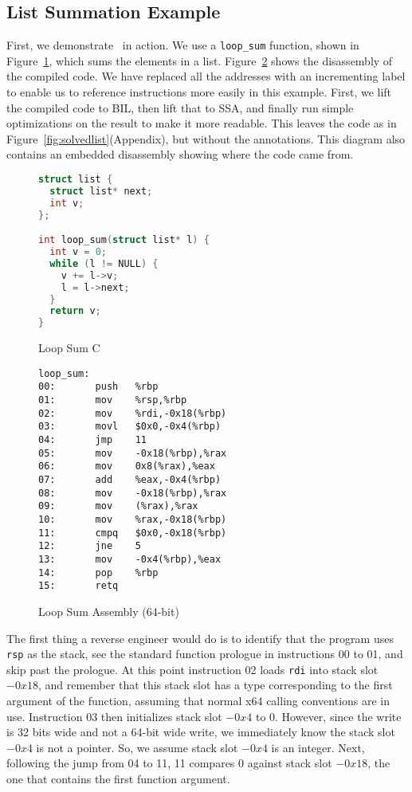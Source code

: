\subsection{List Summation Example}
\label{subsec:workedexample}
First, we demonstrate \bitr\ in action. We use a \texttt{loop\_sum} function, shown in Figure~\ref{fig:loop-sum-c}, which sums the elements in a list. Figure~\ref{fig:loop-sum-asm64} shows the disassembly of the compiled code. We have replaced all the addresses with an incrementing label to enable us to reference instructions more easily in this example.
First, we lift the compiled code to BIL, then lift that to SSA, and finally run simple optimizations on the result to make it more readable. This leaves the code as in Figure~\ref{fig:solvedlist}(Appendix), but without the annotations. This diagram also contains an embedded disassembly showing where the code came from.

\begin{small}
\begin{figure}
\begin{lstlisting}[language=C]
struct list {
  struct list* next;
  int v;
};

int loop_sum(struct list* l) {
  int v = 0;
  while (l != NULL) {
    v += l->v;
    l = l->next;
  }
  return v;
}
\end{lstlisting}
\label{fig:loop-sum-c}
\caption{Loop Sum C}
\end{figure}
\end{small}
\begin{small}
\begin{figure}
\begin{lstlisting}[language={[x86masm]Assembler}]
loop_sum:
00:       push   %rbp
01:       mov    %rsp,%rbp
02:       mov    %rdi,-0x18(%rbp)
03:       movl   $0x0,-0x4(%rbp)
04:       jmp    11
05:       mov    -0x18(%rbp),%rax
06:       mov    0x8(%rax),%eax
07:       add    %eax,-0x4(%rbp)
08:       mov    -0x18(%rbp),%rax
09:       mov    (%rax),%rax
10:       mov    %rax,-0x18(%rbp)
11:       cmpq   $0x0,-0x18(%rbp)
12:       jne    5
13:       mov    -0x4(%rbp),%eax
14:       pop    %rbp
15:       retq   
\end{lstlisting}
\caption{Loop Sum Assembly (64-bit)}
\label{fig:loop-sum-asm64}
\end{figure}
\end{small}

The first thing a reverse engineer would do is to identify that the program uses \texttt{rsp} as the stack, see the standard function prologue in instructions 00 to 01, and skip past the prologue. At this point instruction 02 loads \texttt{rdi} into stack slot $-0x18$, and remember that this stack slot has a type corresponding to the first argument of the function, assuming that normal x64 calling conventions are in use. Instruction 03 then initializes stack slot $-0x4$ to $0$. However, since the write is 32 bits wide and not a 64-bit wide write, we immediately know the stack slot $-0x4$ is not a pointer. So, we assume stack slot $-0x4$ is an integer. Next, following the jump from 04 to 11, 11 compares $0$ against stack slot $-0x18$, the one that contains the first function argument.

